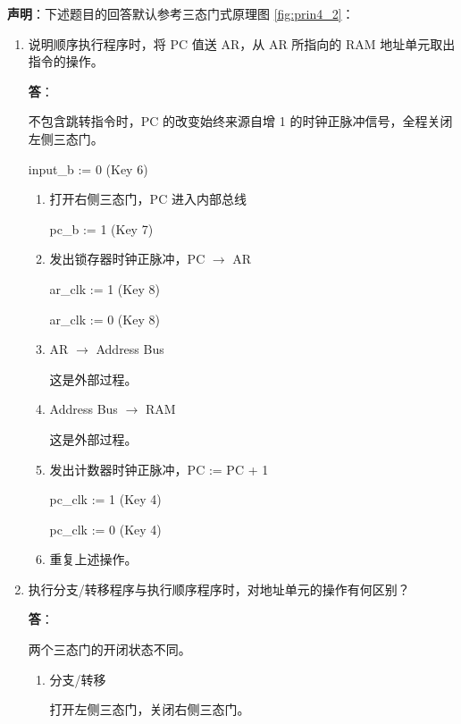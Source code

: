 \textbf{声明}：下述题目的回答默认参考三态门式原理图 \ref{fig:prin4_2}：

\begin{enumerate}
    \item 说明顺序执行程序时，将 PC 值送 AR，从 AR 所指向的 RAM 地址单元取出指令的操作。
    
    \textbf{答}：
    
    不包含跳转指令时，PC 的改变始终来源自增 1 的时钟正脉冲信号，全程关闭左侧三态门。

    input\_b := 0 (Key 6)
        
    \begin{enumerate}
        \item 打开右侧三态门，PC 进入内部总线
        
        pc\_b := 1 (Key 7)

        \item 发出锁存器时钟正脉冲，PC $\to$ AR
        
        ar\_clk := 1 (Key 8)
        
        ar\_clk := 0 (Key 8)
        
        \item AR $\to$ Address Bus
        
        这是外部过程。
        
        \item Address Bus $\to$ RAM
        
        这是外部过程。
        
        \item 发出计数器时钟正脉冲，PC := PC + 1
        
        pc\_clk := 1 (Key 4)
        
        pc\_clk := 0 (Key 4)
        
        \item 重复上述操作。
        
    \end{enumerate}
    
    \item 执行分支/转移程序与执行顺序程序时，对地址单元的操作有何区别？
    
    \textbf{答}：
    
    两个三态门的开闭状态不同。
    
    \begin{enumerate}
        \item 分支/转移

        打开左侧三态门，关闭右侧三态门。
        

\end{enumerate}
\end{enumerate}
